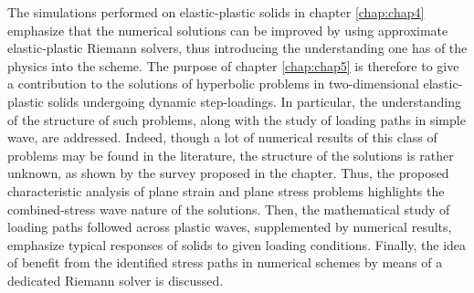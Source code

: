 The simulations performed on elastic-plastic solids in chapter \ref{chap:chap4} emphasize that the numerical solutions can be improved by using approximate elastic-plastic Riemann solvers, thus introducing the understanding one has of the physics into the scheme.
The purpose of chapter \ref{chap:chap5} is therefore to give a contribution to the solutions of hyperbolic problems in two-dimensional elastic-plastic solids undergoing dynamic step-loadings.
In particular, the understanding of the structure of such problems, along with the study of loading paths in simple wave, are addressed. %
Indeed, though a lot of numerical results of this class of problems may be found in the literature, the structure of the solutions is rather unknown, as shown by the survey proposed in the chapter. 
Thus, the proposed characteristic analysis of plane strain and plane stress problems highlights the combined-stress wave nature of the solutions.
Then, the mathematical study of loading paths followed across plastic waves, supplemented by numerical results, emphasize typical responses of solids to given loading conditions.
Finally, the idea of benefit from the identified stress paths in numerical schemes by means of a dedicated Riemann solver is discussed.



